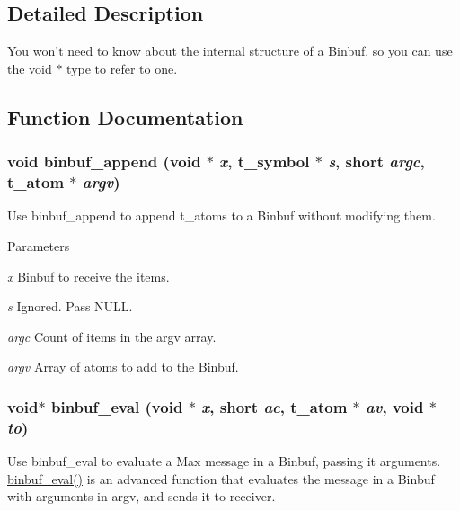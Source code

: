 \subsection{Detailed Description}
You won’t need to know about the internal structure of a Binbuf, so you can use the void $\ast$ type to refer to one. 

\subsection{Function Documentation}
\hypertarget{group__binbuf_ga57f584204ff1860c93ca728ca991fb15}{
\subsubsection[{binbuf\_\-append}]{\setlength{\rightskip}{0pt plus 5cm}void binbuf\_\-append (void $\ast$ {\em x}, \/  {\bf t\_\-symbol} $\ast$ {\em s}, \/  short {\em argc}, \/  {\bf t\_\-atom} $\ast$ {\em argv})}}
\label{group__binbuf_ga57f584204ff1860c93ca728ca991fb15}


Use binbuf\_\-append to append t\_\-atoms to a Binbuf without modifying them. 
\begin{DoxyParams}{Parameters}
\item[{\em x}]Binbuf to receive the items. \item[{\em s}]Ignored. Pass NULL. \item[{\em argc}]Count of items in the argv array. \item[{\em argv}]Array of atoms to add to the Binbuf. \end{DoxyParams}
\hypertarget{group__binbuf_ga90c960507452ce76428d87c0714f9f0e}{
\subsubsection[{binbuf\_\-eval}]{\setlength{\rightskip}{0pt plus 5cm}void$\ast$ binbuf\_\-eval (void $\ast$ {\em x}, \/  short {\em ac}, \/  {\bf t\_\-atom} $\ast$ {\em av}, \/  void $\ast$ {\em to})}}
\label{group__binbuf_ga90c960507452ce76428d87c0714f9f0e}


Use binbuf\_\-eval to evaluate a Max message in a Binbuf, passing it arguments. \hyperlink{group__binbuf_ga90c960507452ce76428d87c0714f9f0e}{binbuf\_\-eval()} is an advanced function that evaluates the message in a Binbuf with arguments in argv, and sends it to receiver.


